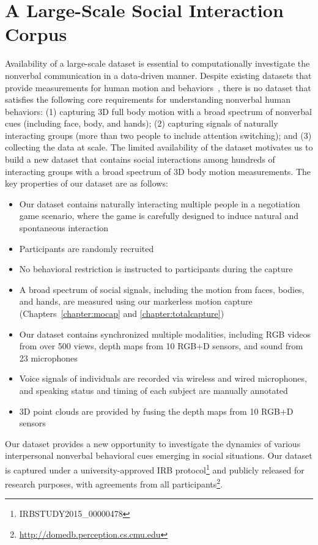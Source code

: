 
\chapter{A Large-Scale Social Interaction Corpus}
\label{chapter:dataset}
Availability of a large-scale dataset is essential to computationally investigate the nonverbal communication in a data-driven manner. Despite existing datasets that provide measurements for human motion and behaviors~\cite{carletta2005ami, Lepri-12, Zen-10,Cristani-11, SALSA-15, h36m_pami}, there is no dataset that satisfies the following core requirements for understanding nonverbal human behaviors: (1) capturing 3D full body motion with a broad spectrum of nonverbal cues (including face, body, and hands); (2) capturing signals of naturally interacting groups (more than two people to include attention switching); and (3) collecting the data at scale. The limited availability of the dataset motivates us to build a new dataset that contains social interactions among hundreds of interacting groups with a broad spectrum of 3D body motion measurements. The key properties of our dataset are as follows:
\begin{itemize}
	\item Our dataset contains naturally interacting multiple people in a negotiation game scenario, where the game is carefully designed to induce natural and spontaneous interaction
	\item Participants   are randomly recruited
	\item No behavioral restriction is instructed to participants during the capture
	\item A broad spectrum of social signals, including the motion from faces, bodies, and hands, are measured using our markerless motion capture (Chapters~\ref{chapter:mocap} and \ref{chapter:totalcapture})
		\item Our dataset contains synchronized multiple modalities, including RGB videos from over 500 views, depth maps from 10 RGB+D sensors, and sound from 23 microphones  
		\item Voice signals of individuals are recorded via wireless and wired microphones, and speaking status and timing of each subject are manually annotated
		\item 3D point clouds are provided by fusing the depth maps from 10 RGB+D sensors
	\end{itemize}
	
	Our dataset provides a new opportunity to investigate the dynamics of various interpersonal nonverbal behavioral cues emerging in social situations. Our dataset is captured under a university-approved IRB protocol\footnote{IRBSTUDY2015\_00000478} and publicly released for research purposes, with agreements from all participants\footnote{\url{http://domedb.perception.cs.cmu.edu}}. 


